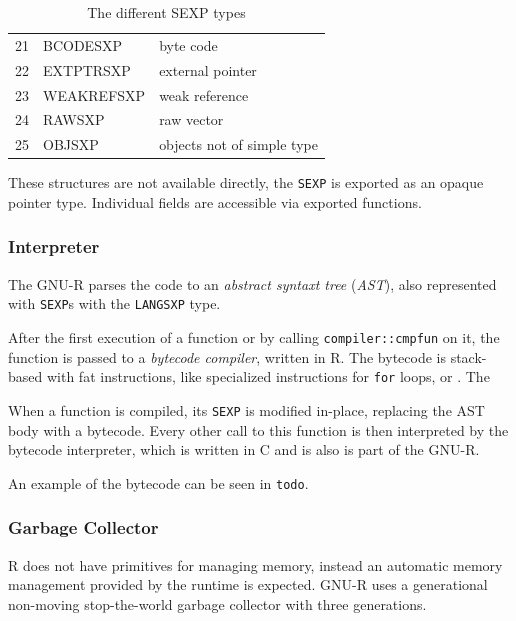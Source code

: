 \begin{table}[h!]
\begin{tabular}{c l l}
		21          & BCODESXP          & byte code                  \\
		22          & EXTPTRSXP         & external pointer           \\
		23          & WEAKREFSXP        & weak reference             \\
		24          & RAWSXP            & raw vector                 \\
		25          & OBJSXP            & objects not of simple type \\
	\end{tabular}
	\caption{The different SEXP types\cite[1.1.1 SEXPTYPEs]{rprojectInternals}}\label{tbl:sexptype}
\end{table}

These structures are not available directly, the \texttt{SEXP} is exported as an opaque pointer type. Individual fields are accessible via exported functions.

\subsubsection*{Interpreter}

The GNU-R parses the code to an \textit{abstract syntaxt tree} (\textit{AST}), also represented with \texttt{SEXP}s with the \texttt{LANGSXP} type.

After the first execution of a function or by calling \texttt{compiler::cmpfun} on it, the function is passed to a \textit{bytecode compiler}, written in R. The bytecode is stack-based with fat instructions, like specialized instructions for \texttt{for} loops, or \todo{\dots}. The

When a function is compiled, its \texttt{SEXP} is modified in-place, replacing the AST body with a bytecode. Every other call to this function is then interpreted by the bytecode interpreter, which is written in C and is also is part of the GNU-R.

An example of the bytecode can be seen in \texttt{todo}.


\subsubsection*{Garbage Collector}
R does not have primitives for managing memory, instead an automatic memory management provided by the runtime is expected. GNU-R uses a generational non-moving stop-the-world garbage collector with three generations\cite{r-gc-notes}.

